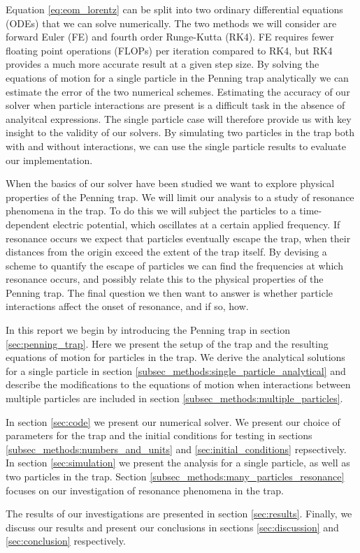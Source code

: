 Equation \eqref{eq:eom_lorentz} can be split into two ordinary differential equations (ODEs) that we can solve numerically. The two methods we will consider are forward Euler (FE) and fourth order Runge-Kutta (RK4). FE requires fewer floating point operations (FLOPs) per iteration compared to RK4, but RK4 provides a much more accurate result at a given step size. By solving the equations of motion for a single particle in the Penning trap analytically we can estimate the error of the two numerical schemes. Estimating the accuracy of our solver when particle interactions are present is a difficult task in the absence of analyitcal expressions. The single particle case will therefore provide us with key insight to the validity of our solvers. By simulating two particles in the trap both with and without interactions, we can use the single particle results to evaluate our implementation.   

When the basics of our solver have been studied we want to explore physical properties of the Penning trap. We will limit our analysis to a study of resonance phenomena in the trap. To do this we will subject the particles to a time-dependent electric potential, which oscillates at a certain applied frequency. If resonance occurs we expect that particles eventually escape the trap, when their distances from the origin exceed the extent of the trap itself. By devising a scheme to quantify the escape of particles we can find the frequencies at which resonance occurs, and possibly relate this to the physical properties of the Penning trap. The final question we then want to answer is whether particle interactions affect the onset of resonance, and if so, how.                



In this report we begin by introducing the Penning trap in section \ref{sec:penning_trap}. Here we present the setup of the trap and the resulting equations of motion for particles in the trap. We derive the analytical solutions for a single particle in section \ref{subsec_methods:single_particle_analytical} and describe the modifications to the equations of motion when interactions between multiple particles are included in section \ref{subsec_methods:multiple_particles}.    

In section \ref{sec:code} we present our numerical solver. We present our choice of parameters for the trap and the initial conditions for testing in sections \ref{subsec_methods:numbers_and_units} and \ref{sec:initial_conditions} repsectively. In section \ref{sec:simulation} we present the analysis for a single particle, as well as two particles in the trap. Section \ref{subsec_methods:many_particles_resonance} focuses on our investigation of resonance phenomena in the trap.  

The results of our investigations are presented in section \ref{sec:results}. Finally, we discuss our results and present our conclusions in sections \ref{sec:discussion} and \ref{sec:conclusion} respectively.   


